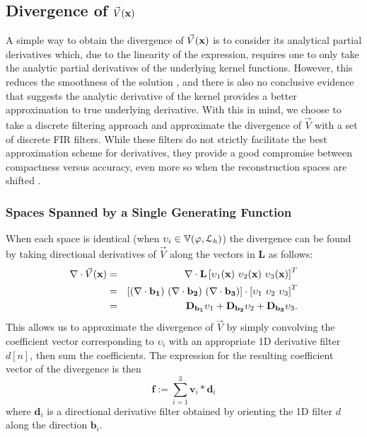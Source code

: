 \subsection{Divergence of $\vec{V}(\mathbf{x})$}
\label{sec:divergence}
A simple way to obtain the divergence of $\vec{V}(\mathbf{x})$ is to consider its analytical partial derivatives which, due to the linearity of the expression, requires one to only take the analytic partial derivatives of the underlying kernel functions. However, this reduces the smoothness of the solution \cite{zahgrad}, and there is also no conclusive evidence that suggests the analytic derivative of the kernel provides a better approximation to true underlying derivative. With this in mind, we choose to take a discrete filtering approach and approximate the divergence of $\vec{V}$ with a set of discrete FIR filters. While these filters do not strictly facilitate the best approximation scheme for derivatives, they provide a good compromise between compactness versus accuracy, even more so when the reconstruction spaces are shifted \cite{gradrev}. 

\subsubsection{Spaces Spanned by a Single Generating Function}
When each space is identical (when $\upsilon_i \in \mathbb{V}({\varphi},{\mathcal{L}_h})$) the divergence can be found by taking directional derivatives of $\vec{V}$ along the vectors in $\mathbf{L}$ as follows: {\small 
\begin{eqnarray}\label{eq:div_dir}
	\grad \cdot \vec{V}(\vx) & = & \grad \cdot \mathbf{L} \left[\upsilon_1(\vx) \ \upsilon_2(\vx) \ \upsilon_3(\vx)\right]^T \notag \\
	 & = & \left[ \mathbf{(\grad \cdot b_1) \ (\grad \cdot b_2) \ (\grad \cdot b_3 ) }\right] \cdot \left[\upsilon_1 \ \upsilon_2 \ \upsilon_3\right]^T \\
	 & = & \dv{\mathbf{b_1}}\upsilon_1 + \dv{\mathbf{b_2}}\upsilon_2 + \dv{\mathbf{b_3}}\upsilon_3. \notag
\end{eqnarray} }
This allows us to approximate the divergence of $\vec{V}$ by simply convolving the coefficient vector corresponding to $\upsilon_i$ with an appropriate 1D derivative filter $d[n]$, then sum the coefficients. The expression for the resulting coefficient vector of the divergence is then {\small
\begin{equation}
	\mathbf{f}:= \sum_{i=1}^3{ \mathbf{v}_i*\mathbf{d}_i}
\label{eq:divergenceViaFiltering}
\end{equation}}
where $\mathbf{d}_i$ is a directional derivative filter obtained by orienting the 1D filter $d$ 
along the direction $\mathbf{b}_i.$ 

